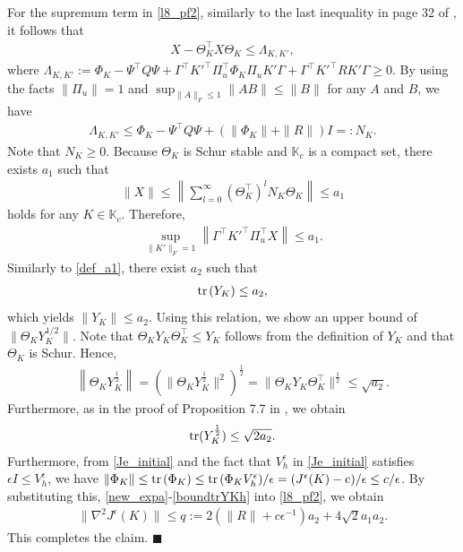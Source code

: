 \documentclass[preprint,5p,times,twocolumn]{elsarticle}
\def\tr{{\rm tr} \hspace{0.5mm}}
\def\qed{\hfill $\blacksquare$}
\begin{document}
For the supremum term in \eqref{l8_pf2}, similarly to the last inequality in page 32 of \cite{bu2019lqr}, it follows that 
\begin{align} 
    X - \Theta_K^{\top}X \Theta_K \leq \Lambda_{K,K'}, \label{XX}
\end{align}
where $\Lambda_{K,K'} := \Phi_K - \Psi^{\top}Q\Psi + \Gamma^{\top}K'^{\top}\Pi_u^{\top}\Phi_K\Pi_uK'\Gamma+\Gamma^{\top}K'^{\top}RK'\Gamma\geq 0$. By using the facts $\|\Pi_u\| = 1$ and $\sup_{\|A\|_F \leq 1}\|AB\| \leq \|B\|$ for any $A$ and $B$, we have
\begin{align}
    \Lambda_{K,K'} \leq \Phi_K - \Psi^{\top}Q\Psi + (\|\Phi_K\|+\|R\|)I =: N_K. 
\end{align}
Note that $N_K \geq 0$.  Because $\Theta_K$ is Schur stable and $\mathbb K_{c}$ is a compact set, there exists $a_1$ such that 
\begin{align}
    \|X\| \leq \left\|\sum_{l=0}^{\infty}(\Theta_K^{\top})^lN_K \Theta_K\right\| \leq a_1 \label{def_a1}
\end{align}
holds for any $K \in \mathbb K_c$. Therefore, 
\begin{align}
\underset{\|K'\|_F=1}{\sup} \left\|\Gamma^{\top}K'^{\top}\Pi_u^{\top}X\right\| \leq a_1 \label{new_expa}.
\end{align} 
Similarly to \eqref{def_a1}, there exist $a_2$ such that 
\begin{align}
    \tr(Y_K) \leq a_2, \label{a2a3}
\end{align}
which yields $\|Y_K\| \leq a_2$. Using this relation, we show an upper bound of $\|\Theta_K Y_K^{1/2}\|$. Note that $\Theta_K Y_K\Theta_K^{\top} \leq Y_K$ follows from the definition of $Y_K$ and that $\Theta_K$ is Schur. Hence, 
\begin{align}\label{boundThKYKh}
   \left\|\Theta_K Y_K^{\frac{1}{2}}\right\| = \left(\|\Theta_K Y_K^{\frac{1}{2}}\|^2 \right)^{\frac{1}{2}} = \|\Theta_K Y_K\Theta_K^{\top}\|^{\frac{1}{2}} \leq \sqrt{a_2}. 
\end{align}
Furthermore, as in the proof of Proposition 7.7 in \cite{bu2019lqr}, we obtain 
\begin{align} \label{boundtrYKh}
{\rm tr}(Y_K^{\frac{1}{2}}) \leq \sqrt{2a_2}. 
\end{align} 
Furthermore, from \eqref{Je_initial} and the fact that $V_h^{\epsilon}$ in \eqref{Je_initial} satisfies ${\epsilon}I \leq V_h^{\epsilon}$, we have $\|\Phi_K\| \leq \tr(\Phi_K) \leq \tr(\Phi_KV_h^{\epsilon})/{\epsilon} = (J^{\epsilon}(K)-{\rm c})/{\epsilon} \leq c/{\epsilon}$. By substituting this, \eqref{new_expa}-\eqref{boundtrYKh} into \eqref{l8_pf2}, we obtain
\begin{align}\label{exact_q}
    \|\nabla^2 J^{\epsilon}(K)\|\leq q := 2(\|R\| + c{\epsilon}^{-1})a_2 + 4\sqrt{2}a_1a_2. 
\end{align}
This completes the claim.   
\qed
\end{document}
